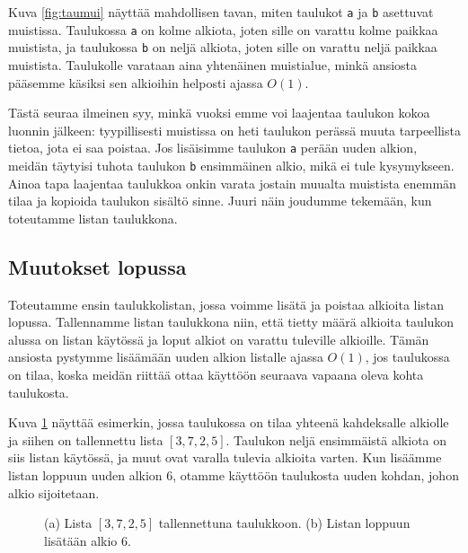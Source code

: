 Kuva \ref{fig:taumui} näyttää mahdollisen tavan, miten taulukot
\texttt{a} ja \texttt{b} asettuvat muistissa.
Taulukossa \texttt{a} on kolme alkiota,
joten sille on varattu kolme paikkaa muistista,
ja taulukossa \texttt{b} on neljä alkiota,
joten sille on varattu neljä paikkaa muistista.
Taulukolle varataan aina yhtenäinen muistialue,
minkä ansiosta pääsemme käsiksi sen alkioihin
helposti ajassa $O(1)$.

Tästä seuraa ilmeinen syy,
minkä vuoksi emme voi laajentaa taulukon kokoa
luonnin jälkeen:
tyypillisesti muistissa on heti taulukon perässä muuta
tarpeellista tietoa, jota ei saa poistaa.
Jos lisäisimme taulukon \texttt{a} perään uuden alkion,
meidän täytyisi tuhota taulukon \texttt{b} ensimmäinen alkio,
mikä ei tule kysymykseen.
Ainoa tapa laajentaa taulukkoa onkin varata
jostain muualta muistista enemmän tilaa ja kopioida
taulukon sisältö sinne.
Juuri näin joudumme tekemään, kun toteutamme listan taulukkona.

\subsection{Muutokset lopussa}

Toteutamme ensin taulukkolistan, jossa voimme
lisätä ja poistaa alkioita listan lopussa.
Tallennamme listan taulukkona niin,
että tietty määrä alkioita taulukon alussa on listan käytössä
ja loput alkiot on varattu tuleville alkioille.
Tämän ansiosta pystymme lisäämään uuden alkion listalle
ajassa $O(1)$, jos taulukossa on tilaa,
koska meidän riittää ottaa käyttöön seuraava
vapaana oleva kohta taulukosta.

Kuva \ref{fig:listau} näyttää esimerkin,
jossa taulukossa on tilaa yhteenä kahdeksalle alkiolle
ja siihen on tallennettu lista $[3,7,2,5]$.
Taulukon neljä ensimmäistä alkiota on siis listan käytössä,
ja muut ovat varalla tulevia alkioita varten.
Kun lisäämme listan loppuun uuden alkion 6,
otamme käyttöön taulukosta uuden kohdan, johon alkio sijoitetaan.

\begin{figure}
\center
{}
\caption{(a) Lista $[3,7,2,5]$ tallennettuna taulukkoon. (b) Listan loppuun lisätään alkio 6.}
\label{fig:listau}
\end{figure}

